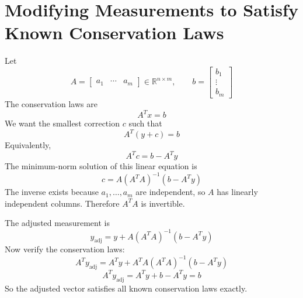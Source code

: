 \section{Modifying Measurements to Satisfy Known Conservation Laws}

Let
\[
A=
\begin{bmatrix}
a_1&\cdots&a_m
\end{bmatrix}
\in\mathbb{R}^{n\times m},
\qquad
b=
\begin{bmatrix}
b_1\\ \vdots\\ b_m
\end{bmatrix}
\]
The conservation laws are
\[
A^T x=b
\]
We want the smallest correction \(c\) such that
\[
A^T(y+c)=b
\]
Equivalently,
\[
A^T c=b-A^T y
\]
The minimum-norm solution of this linear equation is
\[
c=A(A^TA)^{-1}(b-A^T y)
\]
The inverse exists because \(a_1,\ldots,a_m\) are independent, so \(A\) has linearly independent columns. Therefore \(A^TA\) is invertible.

The adjusted measurement is
\[
y_{\mathrm{adj}}=y+A(A^TA)^{-1}(b-A^T y)
\]
Now verify the conservation laws:
\[
A^T y_{\mathrm{adj}}
=
A^T y+A^TA(A^TA)^{-1}(b-A^T y)
\]
\[
A^T y_{\mathrm{adj}}
=
A^T y+b-A^T y=b
\]
So the adjusted vector satisfies all known conservation laws exactly.
